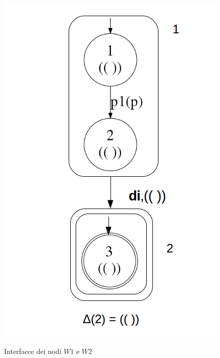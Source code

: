 \begin{figure}[htbp]
{\includegraphics[scale=0.44]{./Img/sac/interfaccia_w2.png}}
\caption{Interfacce dei nodi $W1$ e $W2$}
\label{fig:inter_leaves}
\end{figure}

